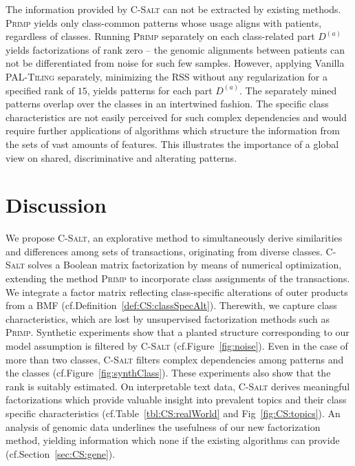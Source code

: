 The information provided by \textsc{C-Salt} can not be extracted by existing methods. \textsc{Primp} yields only class-common patterns whose usage aligns with patients, regardless of classes. Running \textsc{Primp} separately on each class-related part $D^{(a)}$ yields factorizations of rank zero -- the genomic alignments between patients can not be differentiated from noise for such few samples.  
However, applying Vanilla \textsc{PAL-Tiling} separately, minimizing the RSS without any regularization for a specified rank of $15$, yields patterns for each part $D^{(a)}$. The separately mined patterns overlap over the classes in an intertwined fashion. The specific class characteristics are not easily perceived for such complex dependencies and would require further applications of algorithms which structure the information from the sets of vast amounts of features. This illustrates the importance of a global view on shared, discriminative and alterating patterns.
\section{Discussion}
We propose \textsc{C-Salt}, an explorative method to simultaneously derive similarities and differences among sets of transactions, originating from diverse classes. \textsc{C-Salt} solves a Boolean matrix factorization by means of numerical optimization, extending the method \textsc{Primp} to incorporate class assignments of the transactions. We integrate a factor matrix reflecting class-specific alterations of outer products from a BMF (cf.\@ Definition~\ref{def:CS:classSpecAlt}). Therewith, we capture class characteristics, which are lost by unsupervised factorization methods such as \textsc{Primp}. Synthetic experiments show that a planted structure corresponding to our model assumption is filtered by \textsc{C-Salt} (cf.\@ Figure~\ref{fig:noise}). Even in the case of more than two classes, \textsc{C-Salt} filters complex dependencies among patterns and the classes (cf.\@ Figure~\ref{fig:synthClass}). These experiments also show that the rank is suitably estimated. On interpretable text data, \textsc{C-Salt} derives meaningful factorizations which provide valuable insight into prevalent topics and their class specific characteristics (cf.\@ Table~\ref{tbl:CS:realWorld} and Fig~\ref{fig:CS:topics}). An analysis of genomic data underlines the usefulness of our new factorization method, yielding information which none if the existing algorithms can provide (cf.\@ Section~\ref{sec:CS:gene}).
